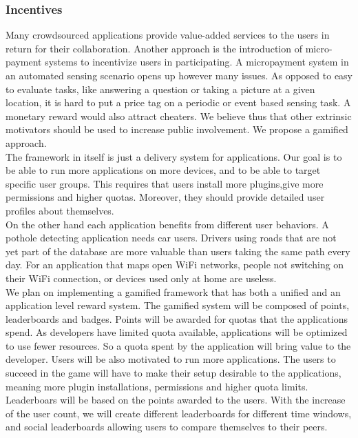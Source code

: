 \documentclass[conference,letterpaper]{IEEEtran}
\begin{document}
\subsubsection{Incentives}
Many crowdsourced applications provide value-added services to the users in return for their collaboration. Another approach is the introduction of micro-payment systems to incentivize users in participating. A micropayment system in an automated sensing scenario opens up however many issues. As opposed to easy to evaluate tasks, like answering a question or taking a picture at a given location, it is hard to put a price tag on a periodic or event based sensing task. A monetary reward would also attract cheaters. We believe thus that other extrinsic motivators should be used to increase public involvement. We propose a gamified approach. \\
\indent The framework in itself is just a delivery system for applications. Our goal is to be able to run more applications on more devices, and to be able to target specific user groups. This requires that users install more plugins,give more permissions and higher quotas. Moreover, they should provide detailed user profiles about themselves. \\
\indent On the other hand each application benefits from different user behaviors. A pothole detecting application needs car users. Drivers using roads that are not yet part of the database are more valuable than users taking the same path every day. For an application that maps open WiFi networks, people not switching on their WiFi connection, or devices used only at home are useless.\\
\indent We plan on implementing a gamified framework  that has both a unified and an application level reward system. The gamified system will be composed of points, leaderboards and badges. Points will be awarded for quotas that the applications spend. As developers have limited quota available, applications will be optimized to use fewer resources. So a quota spent by the application will bring value to the developer. Users will be also motivated to run more applications. The users to succeed in the game will have to make their setup desirable to the applications, meaning more plugin installations, permissions and higher quota limits. Leaderboars will be based on the points awarded to the users. With the increase of the user count, we will create different leaderboards for different time windows, and social leaderboards allowing users to compare themselves to their peers.\\
\end{document}
